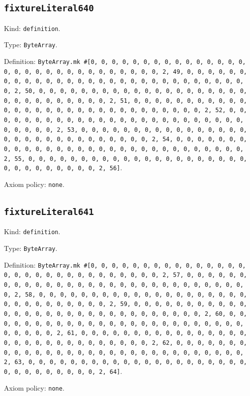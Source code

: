 \documentclass[11pt]{article}
\begin{document}
\subsection*{\texttt{fixtureLiteral640}}
\noindent Kind: \texttt{definition}.\par
\noindent Type: \texttt{ByteArray}.\par
\noindent Definition: \texttt{ByteArray.mk \#[0, 0, 0, 0, 0, 0, 0, 0, 0, 0, 0, 0, 0, 0, 0, 0, 0, 0, 0, 0, 0, 0, 0, 0, 0, 0, 0, 0, 0, 0, 2, 49, 0, 0, 0, 0, 0, 0, 0, 0, 0, 0, 0, 0, 0, 0, 0, 0, 0, 0, 0, 0, 0, 0, 0, 0, 0, 0, 0, 0, 0, 0, 2, 50, 0, 0, 0, 0, 0, 0, 0, 0, 0, 0, 0, 0, 0, 0, 0, 0, 0, 0, 0, 0, 0, 0, 0, 0, 0, 0, 0, 0, 0, 0, 2, 51, 0, 0, 0, 0, 0, 0, 0, 0, 0, 0, 0, 0, 0, 0, 0, 0, 0, 0, 0, 0, 0, 0, 0, 0, 0, 0, 0, 0, 0, 0, 2, 52, 0, 0, 0, 0, 0, 0, 0, 0, 0, 0, 0, 0, 0, 0, 0, 0, 0, 0, 0, 0, 0, 0, 0, 0, 0, 0, 0, 0, 0, 0, 2, 53, 0, 0, 0, 0, 0, 0, 0, 0, 0, 0, 0, 0, 0, 0, 0, 0, 0, 0, 0, 0, 0, 0, 0, 0, 0, 0, 0, 0, 0, 0, 2, 54, 0, 0, 0, 0, 0, 0, 0, 0, 0, 0, 0, 0, 0, 0, 0, 0, 0, 0, 0, 0, 0, 0, 0, 0, 0, 0, 0, 0, 0, 0, 2, 55, 0, 0, 0, 0, 0, 0, 0, 0, 0, 0, 0, 0, 0, 0, 0, 0, 0, 0, 0, 0, 0, 0, 0, 0, 0, 0, 0, 0, 0, 0, 2, 56]}.\par
\noindent Axiom policy: \texttt{none}.\par
\subsection*{\texttt{fixtureLiteral641}}
\noindent Kind: \texttt{definition}.\par
\noindent Type: \texttt{ByteArray}.\par
\noindent Definition: \texttt{ByteArray.mk \#[0, 0, 0, 0, 0, 0, 0, 0, 0, 0, 0, 0, 0, 0, 0, 0, 0, 0, 0, 0, 0, 0, 0, 0, 0, 0, 0, 0, 0, 0, 2, 57, 0, 0, 0, 0, 0, 0, 0, 0, 0, 0, 0, 0, 0, 0, 0, 0, 0, 0, 0, 0, 0, 0, 0, 0, 0, 0, 0, 0, 0, 0, 2, 58, 0, 0, 0, 0, 0, 0, 0, 0, 0, 0, 0, 0, 0, 0, 0, 0, 0, 0, 0, 0, 0, 0, 0, 0, 0, 0, 0, 0, 0, 0, 2, 59, 0, 0, 0, 0, 0, 0, 0, 0, 0, 0, 0, 0, 0, 0, 0, 0, 0, 0, 0, 0, 0, 0, 0, 0, 0, 0, 0, 0, 0, 0, 2, 60, 0, 0, 0, 0, 0, 0, 0, 0, 0, 0, 0, 0, 0, 0, 0, 0, 0, 0, 0, 0, 0, 0, 0, 0, 0, 0, 0, 0, 0, 0, 2, 61, 0, 0, 0, 0, 0, 0, 0, 0, 0, 0, 0, 0, 0, 0, 0, 0, 0, 0, 0, 0, 0, 0, 0, 0, 0, 0, 0, 0, 0, 0, 2, 62, 0, 0, 0, 0, 0, 0, 0, 0, 0, 0, 0, 0, 0, 0, 0, 0, 0, 0, 0, 0, 0, 0, 0, 0, 0, 0, 0, 0, 0, 0, 2, 63, 0, 0, 0, 0, 0, 0, 0, 0, 0, 0, 0, 0, 0, 0, 0, 0, 0, 0, 0, 0, 0, 0, 0, 0, 0, 0, 0, 0, 0, 0, 2, 64]}.\par
\noindent Axiom policy: \texttt{none}.\par
\end{document}
